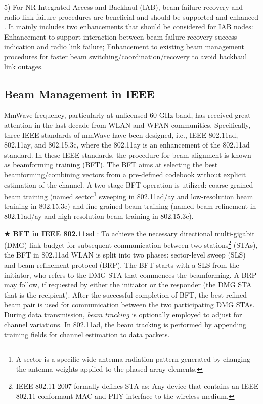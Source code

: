 \documentclass[journal,comsoc]{IEEEtran}
\begin{document}
5) For NR Integrated Access and Backhaul (IAB), beam failure recovery and radio link failure procedures are beneficial and should be supported and enhanced \cite{3GPP-TR-38874}. It mainly includes two enhancements that should be considered for IAB nodes: Enhancement to support interaction between beam failure recovery success indication and radio link failure; Enhancement to existing beam management procedures for faster beam switching/coordination/recovery to avoid backhaul link outages.

\subsection{Beam Management in IEEE}
MmWave frequency, particularly at unlicensed 60 GHz band, has received great attention in the last decade from WLAN and WPAN communities. Specifically, three IEEE standards of mmWave have been designed, i.e., IEEE 802.11ad, 802.11ay, and 802.15.3c, where the 802.11ay is an enhancement of the 802.11ad standard. In these IEEE standards, the procedure for beam alignment is known as beamforming training (BFT). The BFT aims at selecting the best beamforming/combining vectors from a pre-defined codebook without explicit estimation of the channel. A two-stage BFT operation is utilized: coarse-grained beam training (named sector\footnote{A sector is a specific wide antenna radiation pattern generated by changing the antenna weights applied to the phased array elements.} sweeping in 802.11ad/ay and low-resolution beam training in 802.15.3c) and fine-grained beam training (named beam refinement in 802.11ad/ay and high-resolution beam training in 802.15.3c).

$\bigstar$ \textbf{BFT in IEEE 802.11ad} \cite{IEEE-Std-802.11ad}: To achieve the necessary directional multi-gigabit (DMG) link budget for subsequent communication between two stations\footnote{IEEE 802.11-2007 formally defines STA as: Any device that contains an IEEE 802.11-conformant MAC and PHY interface to the wireless medium.} (STAs), the BFT in 802.11ad WLAN is split into two phases: sector-level sweep (SLS) and beam refinement protocol (BRP). The BFT starts with a SLS from the initiator, who refers to the DMG STA that commences the beamforming. A BRP may follow, if requested by either the initiator or the responder (the DMG STA that is the recipient). After the successful completion of BFT, the best refined beam pair is used for communication between the two participating DMG STAs. During data transmission, \emph{beam tracking} is optionally employed to adjust for channel variations. In 802.11ad, the beam tracking is performed by appending training fields for channel estimation to data packets.
\end{document}
